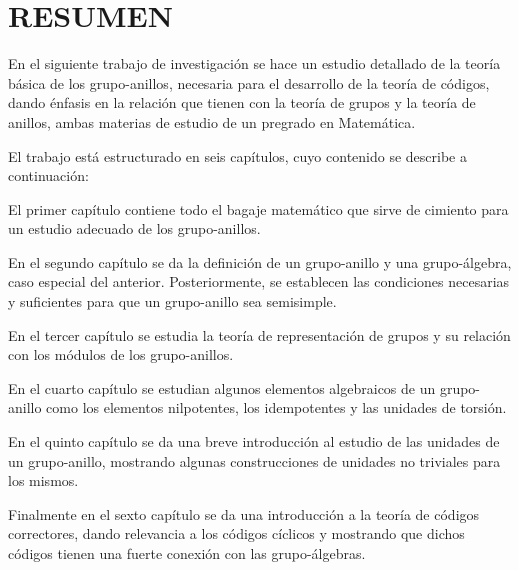 \chapter{RESUMEN}
En el siguiente trabajo de investigación se hace un estudio detallado de la teoría básica de los grupo-anillos, necesaria para el desarrollo de la teoría de códigos, dando énfasis en la relación que tienen con la teoría de grupos y la teoría de anillos, ambas materias de estudio de un pregrado en Matemática.

El trabajo está estructurado en seis capítulos, cuyo contenido se describe a continuación:

El primer capítulo contiene todo el bagaje matemático que sirve de cimiento para un  estudio adecuado de los grupo-anillos. 

En el segundo capítulo se da la definición de un grupo-anillo y una grupo-álgebra, caso especial del anterior. Posteriormente, se establecen las condiciones necesarias y suficientes para que un grupo-anillo sea semisimple. 

En el tercer capítulo se estudia la teoría de representación de grupos y su relación con los módulos de los grupo-anillos. 

En el cuarto capítulo se estudian algunos elementos algebraicos de un grupo-anillo como los elementos nilpotentes, los idempotentes y las unidades de torsión.

En el quinto capítulo se da una breve introducción al estudio de las unidades de un grupo-anillo, mostrando algunas construcciones de unidades no triviales para los mismos.

Finalmente en el sexto capítulo se da una introducción a la teoría de códigos correctores, dando relevancia a los códigos cíclicos y mostrando que dichos códigos tienen una fuerte conexión con las grupo-álgebras.




